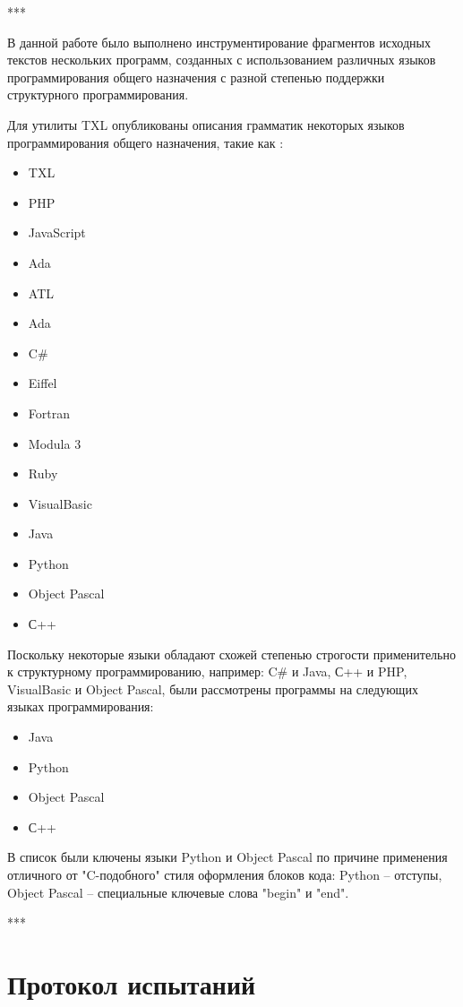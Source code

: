 ***

В данной работе было выполнено инструментирование фрагментов исходных текстов нескольких программ, созданных с использованием различных языков программирования общего назначения с разной степенью поддержки структурного программирования.

Для утилиты TXL опубликованы описания грамматик некоторых языков программирования общего назначения, такие как \cite{txl-resources}:
\begin{itemize}
  \item TXL
  \item PHP
  \item JavaScript
  \item Ada
  \item ATL
  \item Ada
  \item C\#
  \item Eiffel
  \item Fortran
  \item Modula 3
  \item Ruby
  \item VisualBasic

  \item Java
  \item Python
  \item Object Pascal
  \item С++
\end{itemize}

Поскольку некоторые языки обладают схожей степенью строгости применительно к структурному программированию, например: C\# и Java, С++ и PHP, VisualBasic и Object Pascal, были рассмотрены программы на следующих языках программирования:
\begin{itemize}
  \item Java
  \item Python
  \item Object Pascal
  \item С++
\end{itemize}

В список были ключены языки Python и Object Pascal по причине применения отличного от "C-подобного" стиля оформления блоков кода: Python -- отступы, Object Pascal -- специальные ключевые слова "begin" и "end".

***

\section{Протокол испытаний}

